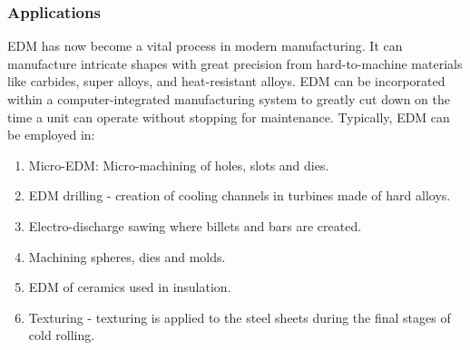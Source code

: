 \subsubsection{Applications}
EDM has now become a vital process in modern manufacturing. It can manufacture intricate shapes with great precision from hard-to-machine materials like carbides, super alloys, and heat-resistant alloys. EDM can be incorporated within a computer-integrated manufacturing system to greatly cut down on the time a unit can operate without stopping for maintenance. Typically, EDM can be employed in:
\begin{enumerate}
	\item Micro-EDM: Micro-machining of holes, slots and dies.
	\item EDM drilling - creation of cooling channels in turbines made of hard alloys.
	\item Electro-discharge sawing where billets and bars are created.
	\item Machining spheres, dies and molds.
	\item EDM of ceramics used in insulation.
	\item Texturing - texturing is applied to the steel sheets during the final stages of cold rolling.
\end{enumerate}

